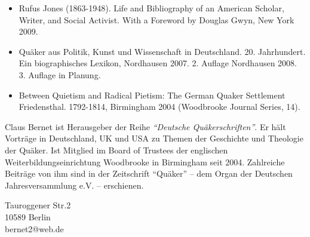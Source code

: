 \begin{itemize}
 \item Rufus Jones (1863-1948). Life and Bibliography of an American Scholar,
Writer, and Social Activist. With a Foreword by Douglas Gwyn, New York 2009.
 \item Quäker aus Politik, Kunst und Wissenschaft in Deutschland. 20.
Jahrhundert. Ein biographisches Lexikon, Nordhausen 2007. 2. Auflage Nordhausen
2008. 3. Auflage in Planung.
 \item Between Quietism and Radical Pietism: The German Quaker Settlement
Friedensthal. 1792-1814, Birmingham 2004 (Woodbrooke Journal Series, 14).
\end{itemize}

\medskip


Claus Bernet ist Herausgeber der Reihe \textit{"`Deutsche Quäkerschriften"'}. Er
hält Vorträge in Deutschland, UK und USA zu Themen der Geschichte und Theologie
der Quäker. Ist Mitglied im Board of Trustees der englischen
Weiterbildungseinrichtung Woodbrooke in Birmingham seit 2004. Zahlreiche
Beiträge von ihm sind in der Zeitschrift "`Quäker"' -- dem Organ der Deutschen
Jahresversammlung e.V. -- erschienen.

\medskip

\begin{center}
\parbox{7,5cm}{
Tauroggener Str.2
\\10589 Berlin
\\bernet2@web.de
}
\end{center}